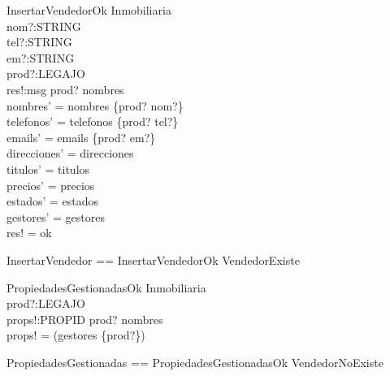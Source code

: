 \begin{schema}{InsertarVendedorOk}
\Delta Inmobiliaria \\
nom?:STRING \\
tel?:STRING \\
em?:STRING \\
prod?:LEGAJO \\
res!:msg
\where
prod? \notin \dom nombres \\
nombres' = nombres \cup \{prod? \mapsto nom?\}  \\
telefonos' = telefonos \cup \{prod? \mapsto tel?\}  \\
emails' =  emails \cup \{prod? \mapsto em?\}  \\
direcciones' = direcciones\\
titulos' = titulos\\
precios' = precios\\
estados' = estados\\
gestores' = gestores\\
res! = ok
\end{schema}

\begin{zed}
InsertarVendedor == InsertarVendedorOk \lor VendedorExiste
\end{zed}

\begin{schema}{PropiedadesGestionadasOk}
\Xi Inmobiliaria \\
prod?:LEGAJO \\
props!:\power PROPID
\where
prod? \in \dom nombres \\
props! = \dom(gestores \rres \{prod?\})
\end{schema}

\begin{zed}
PropiedadesGestionadas == PropiedadesGestionadasOk \lor VendedorNoExiste
\end{zed}